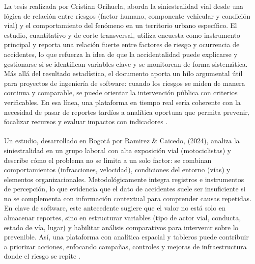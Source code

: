 La tesis realizada por Cristian Orihuela, aborda la siniestralidad vial desde una lógica de relación entre riesgos (factor humano, componente vehicular y condición vial) y el comportamiento del fenómeno en un territorio urbano específico. El estudio, cuantitativo y de corte transversal, utiliza encuesta como instrumento principal y reporta una relación fuerte entre factores de riesgo y ocurrencia de accidentes, lo que refuerza la idea de que la accidentalidad puede explicarse y gestionarse si se identifican variables clave y se monitorean de forma sistemática. Más allá del resultado estadístico, el documento aporta un hilo argumental útil para proyectos de ingeniería de software: cuando los riesgos se miden de manera continua y comparable, se puede orientar la intervención pública con criterios verificables. En esa línea, una plataforma en tiempo real sería coherente con la necesidad de pasar de reportes tardíos a analítica oportuna que permita prevenir, focalizar recursos y evaluar impactos con indicadores \cite{orihuela2025}.\\\\
Un estudio, desarrollado en Bogotá por Ramirez \& Caicedo, (2024), analiza la siniestralidad en un grupo laboral con alta exposición vial (motociclistas) y describe cómo el problema no se limita a un solo factor: se combinan comportamientos (infracciones, velocidad), condiciones del entorno (vías) y elementos organizacionales. Metodológicamente integra registros e instrumentos de percepción, lo que evidencia que el dato de accidentes suele ser insuficiente si no se complementa con información contextual para comprender causas repetidas. En clave de software, este antecedente sugiere que el valor no está solo en almacenar reportes, sino en estructurar variables (tipo de actor vial, conducta, estado de vía, lugar) y habilitar análisis comparativos para intervenir sobre lo prevenible. Así, una plataforma con analítica espacial y tableros puede contribuir a priorizar acciones, enfocando campañas, controles y mejoras de infraestructura donde el riesgo se repite \cite{ramirez2024}.\\\\

